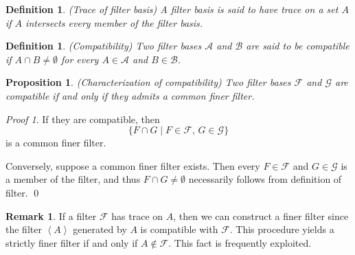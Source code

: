 \documentclass[a4paper,12pt]{article}
\newtheorem{prp}[thm]{Proposition}
\newtheorem{dfn}[thm]{Definition}
\theoremstyle{remark}
\newtheorem*{prf}{Proof}
\theoremstyle{definition}
\newtheorem{rem}[thm]{Remark}
\theoremstyle{definition}
\theoremstyle{definition}
\begin{document}
\begin{dfn} (Trace of filter basis)
	A filter basis is said to have trace on a set \( A \) if \( A \) intersects every member of the filter basis.
\end{dfn}

\begin{dfn} (Compatibility)
	Two filter bases \( \mathscr{A} \) and \( \mathscr{B} \) are said to be compatible if \( A \cap B \neq \emptyset \) for every \( A \in \mathscr{A} \) and \( B \in \mathscr{B} \).
\end{dfn}

\begin{prp}\label{compatible} (Characterization of compatibility)
	Two filter bases \( \mathscr{F} \) and \( \mathscr{G} \) are compatible if and only if they admits a common finer filter.
\end{prp}
\begin{prf}
	If they are compatible, then
	\begin{equation*}
		\{F \cap G \mid F \in \mathscr{F},\,G \in \mathscr{G}\}
	\end{equation*}
	is a common finer filter.

	Conversely, suppose a common finer filter exists. Then every \( F \in \mathscr{F} \) and \( G \in \mathscr{G} \) is a member of the filter, and thus \( F \cap G \neq \emptyset \) necessarily follows from definition of filter.
	\qed\end{prf}

\begin{rem}\label{rem trace}
	If a filter \( \mathscr{F} \) has trace on \( A \), then we can construct a finer filter since the filter \( \left< A \right> \) generated by \( A \) is compatible with \( \mathscr{F} \). This procedure yields a strictly finer filter if and only if \( A \notin \mathscr{F}\). This fact is frequently exploited.
\end{rem}

\end{document}
